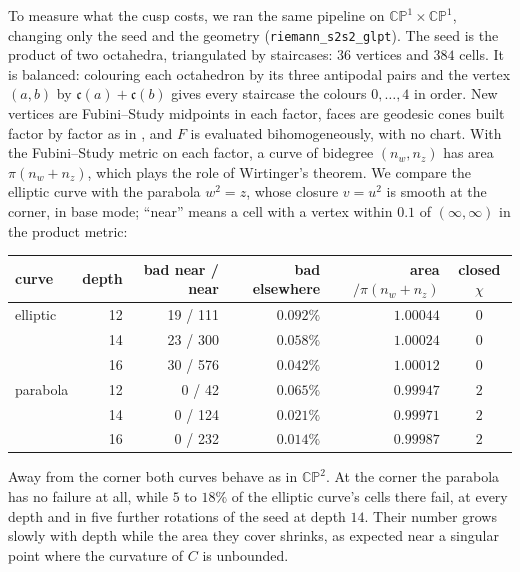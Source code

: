 \documentclass[11pt]{article}
\theoremstyle{plain}
\theoremstyle{definition}
\theoremstyle{remark}
\newcommand{\CP}{\mathbb{CP}}
\newcommand{\col}{\mathfrak{c}}
\begin{document}
To measure what the cusp costs, we ran the same pipeline on
$\CP^1\times\CP^1$, changing only the seed and the geometry
(\texttt{riemann\_s2s2\_glpt}). The seed is the product of two octahedra,
triangulated by staircases: $36$ vertices and $384$ cells. It is
balanced: colouring each octahedron by its three antipodal pairs and the
vertex $(a,b)$ by $\col(a)+\col(b)$ gives every staircase the colours
$0,\dots,4$ in order. New vertices are Fubini--Study midpoints in each
factor, faces are geodesic cones built factor by factor as in
, and $F$ is evaluated bihomogeneously, with no chart.
With the Fubini--Study metric on each factor, a curve of bidegree
$(n_w,n_z)$ has area $\pi(n_w+n_z)$, which plays the role of Wirtinger's
theorem. We compare the elliptic curve with the parabola $w^2=z$, whose
closure $v=u^2$ is smooth at the corner, in base mode; ``near'' means a
cell with a vertex within $0.1$ of $(\infty,\infty)$ in the product
metric:
\begin{center}
\small
\begin{tabular}{@{}lrrrrc@{}}
\toprule
curve & depth & bad near / near & bad elsewhere & area$/\pi(n_w{+}n_z)$ & closed $\chi$ \\
\midrule
elliptic & 12 & 19 / 111 & $0.092\%$ & $1.00044$ & $0$ \\
         & 14 & 23 / 300 & $0.058\%$ & $1.00024$ & $0$ \\
         & 16 & 30 / 576 & $0.042\%$ & $1.00012$ & $0$ \\
\midrule
parabola & 12 & 0 / 42  & $0.065\%$ & $0.99947$ & $2$ \\
         & 14 & 0 / 124 & $0.021\%$ & $0.99971$ & $2$ \\
         & 16 & 0 / 232 & $0.014\%$ & $0.99987$ & $2$ \\
\bottomrule
\end{tabular}
\end{center}
Away from the corner both curves behave as in $\CP^2$. At the corner the
parabola has no failure at all, while $5$ to $18\%$ of the elliptic
curve's cells there fail, at every depth and in five further rotations of
the seed at depth $14$. Their number grows slowly with depth while the
area they cover shrinks, as expected near a singular point where the
curvature of $C$ is unbounded.
\end{document}
